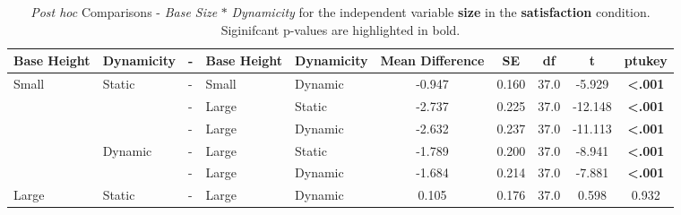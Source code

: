 \begin{table*}[ht]
    \centering
    \caption{\textit{Post hoc} Comparisons - \textit{Base Size} $\ast$ \textit{Dynamicity} for the independent variable \textbf{size} in the \textbf{satisfaction} condition. Siginifcant p-values are highlighted in bold.}
    \begin{tabular}{lllll|ccccc}
    \toprule
    \textbf{Base Height} & \textbf{Dynamicity} & -  & \textbf{Base Height} & \textbf{Dynamicity} & \textbf{Mean Difference} & \textbf{SE} & \textbf{df} & \textbf{t} & \textbf{ptukey} \\
    \midrule
    Small                & Static              & - & Small                  & Dynamic             & -0.947                   & 0.160       & 37.0        & -5.929     & \textbf{<.001}           \\
                         &                     & - & Large                  & Static              & -2.737                   & 0.225       & 37.0        & -12.148    & \textbf{<.001}           \\
                         &                     & - & Large                  & Dynamic             & -2.632                   & 0.237       & 37.0        & -11.113    & \textbf{<.001}           \\
                         & Dynamic             & - & Large                  & Static              & -1.789                   & 0.200       & 37.0        & -8.941     & \textbf{<.001}           \\
                         &                     & - & Large                  & Dynamic             & -1.684                   & 0.214       & 37.0        & -7.881     & \textbf{<.001}           \\
    Large                & Static              & - & Large                  & Dynamic             & 0.105                    & 0.176       & 37.0        & 0.598      & 0.932           \\
    \bottomrule                           
    \end{tabular}
\end{table*}


